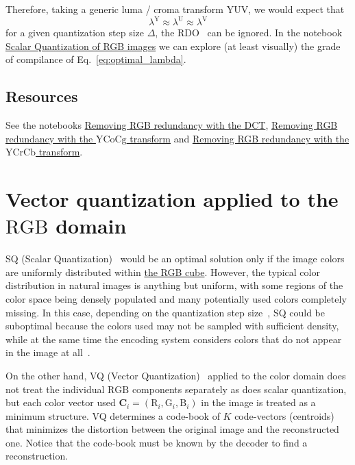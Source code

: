 Therefore, taking a generic luma / croma transform $\text{YUV}$, we would expect that
\begin{equation}
  \lambda^{\text{Y}} \approx \lambda^{\text{U}} \approx \lambda^{\text{V}}
  \label{eq:optimal_lambda}
\end{equation}
for a given quantization step size $\Delta$, the
RDO~\cite{vruiz__information_theory} can be ignored. In the notebook
\href{https://github.com/Sistemas-Multimedia/Sistemas-Multimedia.github.io/blob/master/contents/RGB_SQ/RGB_SQ.ipynb}{Scalar
  Quantization of RGB images} we can explore (at least visually) the
grade of compilance of Eq.~\eqref{eq:optimal_lambda}.

\subsection*{Resources}
See the notebooks
\href{https://github.com/vicente-gonzalez-ruiz/color_transforms/blob/main/docs/3DCT/3DCT_over_RGB.ipynb}{Removing
  RGB redundancy with the DCT},
\href{https://github.com/vicente-gonzalez-ruiz/color_transforms/blob/main/docs/YCoCg/YCoCg_over_RGB.ipynb}{Removing
  RGB redundancy with the $\text{YCoCg}$ transform} and
\href{https://github.com/vicente-gonzalez-ruiz/color_transforms/blob/main/docs/YCrCb/YCrCb_over_RGB.ipynb}{Removing
  RGB redundancy with the $\text{YCrCb}$ transform}.

\section{Vector quantization applied to the $\text{RGB}$ domain}

SQ (Scalar
Quantization)~\cite{vruiz__scalar_quantization,sayood2017introduction}
would be an optimal solution only if the image colors are uniformly
distributed within
\href{https://en.wikipedia.org/wiki/RGB_color_model}{the RGB
  cube}. However, the typical color distribution in natural images is
anything but uniform, with some regions of the color space being
densely populated and many potentially used colors completely
missing. In this case, depending on the quantization step
size~\cite{vruiz__signal_quantization}, SQ could be suboptimal because
the colors used may not be sampled with sufficient density, while at the
same time the encoding system considers colors that do not appear
in the image at all~\cite{burger2016digital}.

On the other hand, VQ (Vector
Quantization)~\cite{vruiz__vector_quantization,sayood2017introduction}
applied to the color domain does not treat the individual $\text{RGB}$
components separately as does scalar quantization, but each color
vector used ${\mathbf C}_i = (\text{R}_i, \text{G}_i, \text{B}_i )$ in
the image is treated as a minimum structure. VQ determines a code-book
of $K$ code-vectors (centroids) that minimizes the distortion between
the original image and the reconstructed one. Notice that the
code-book must be known by the decoder to find a reconstruction.


